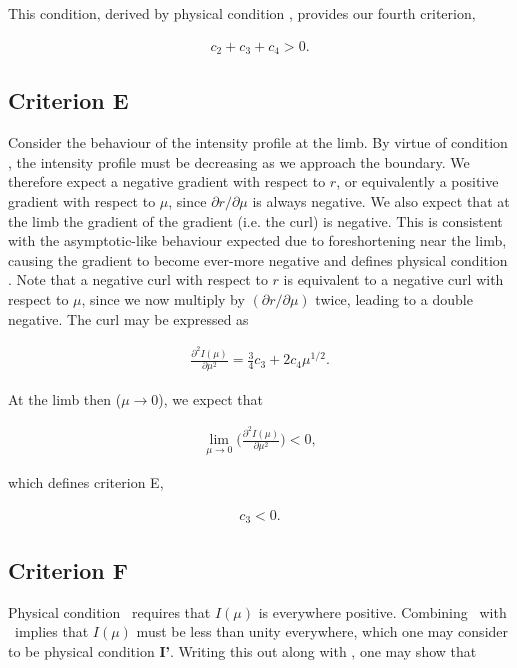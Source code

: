 This condition, derived by physical condition \II, provides our fourth
criterion,

\begin{align}
c_2 + c_3 + c_4 > 0.
\label{eqn:criterionD}
\end{align}

\subsection{Criterion E}
\label{sub:criterionE}

Consider the behaviour of the intensity profile at the limb. By virtue of
condition \II, the intensity profile must be decreasing as we approach the 
boundary. We therefore expect a negative gradient with respect to $r$, or 
equivalently a positive gradient with respect to $\mu$, since 
$\partial r/\partial \mu$ is always negative. We also expect that at the limb 
the gradient of the gradient (i.e. the curl) is negative. This is consistent 
with the asymptotic-like behaviour expected due to foreshortening near the limb, 
causing the gradient to become ever-more negative and defines physical condition 
\III. Note that a negative curl with respect to $r$ is equivalent to a negative 
curl with respect to $\mu$, since we now multiply by $(\partial r/\partial \mu)$ 
twice, leading to a double negative. The curl may be expressed as

\begin{align}
\frac{\partial^2 I(\mu)}{\partial \mu^2} = \frac{3}{4} c_3 + 2 c_4 \mu^{1/2}.
\end{align}

At the limb then ($\mu \to 0$), we expect that

\begin{align}
\lim_{\mu\to0} \Big(\frac{\partial^2 I(\mu)}{\partial \mu^2}\Big) < 0,
\end{align}

which defines criterion E,

\begin{align}
c_3 < 0.
\label{eqn:criterionE}
\end{align}

\subsection{Criterion F}
\label{sub:criterionF}

Physical condition \I\ requires that $I(\mu)$ is everywhere positive. Combining
\I\ with \II\ implies that $I(\mu)$ must be less than unity everywhere, which
one may consider to be physical condition \textbf{I'}. Writing this out along 
with \II, one may show that


